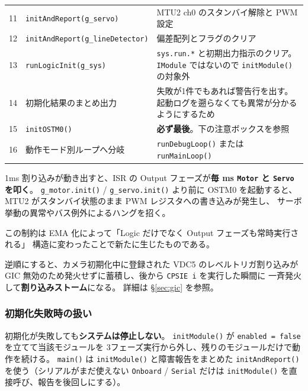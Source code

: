 \documentclass[a4paper,11pt,dvipdfmx]{jsarticle}
\begin{document}
\begin{longtable}{c l p{78mm}}
11 & \texttt{initAndReport(g\_servo)}    & MTU2 ch0 のスタンバイ解除と PWM 設定 \\
12 & \texttt{initAndReport(g\_lineDetector)} & 偏差配列とフラグのクリア \\
13 & \texttt{runLogicInit(g\_sys)}   & \texttt{sys.run.*} と初期出力指示のクリア。
     \texttt{IModule} ではないので \texttt{initModule()} の対象外 \\
14 & 初期化結果のまとめ出力     & 失敗が1件でもあれば警告行を出す。
     起動ログを遡らなくても異常が分かるようにするため \\
15 & \texttt{initOSTM0()}       & \textbf{必ず最後}。下の注意ボックスを参照 \\
16 & 動作モード別ループへ分岐   & \texttt{runDebugLoop()} または \texttt{runMainLoop()} \\
\bottomrule
\end{longtable}

\begin{cautionbox}
1ms 割り込みが動き出すと、ISR の Output フェーズが\textbf{毎 ms
\texttt{Motor} と \texttt{Servo} を叩く}。
\texttt{g\_motor.init()} / \texttt{g\_servo.init()} より前に OSTM0 を起動すると、
MTU2 がスタンバイ状態のまま PWM レジスタへの書き込みが発生し、
サーボ挙動の異常やバス例外によるハングを招く。

この制約は EMA 化によって「Logic だけでなく Output フェーズも常時実行される」
構造に変わったことで新たに生じたものである。
\end{cautionbox}

\begin{cautionbox}
逆順にすると、カメラ初期化中に登録された VDC5 のレベルトリガ割り込みが
GIC 無効のため発火せずに蓄積し、後から \texttt{CPSIE i} を実行した瞬間に
一斉発火して\textbf{割り込みストーム}になる。
詳細は \hyperref[sec:gic]{§\ref*{sec:gic}} を参照。
\end{cautionbox}

\subsubsection{初期化失敗時の扱い}\label{sec:bootfail}

初期化が失敗しても\textbf{システムは停止しない}。
\texttt{initModule()} が \texttt{enabled = false} を立てて当該モジュールを
3フェーズ実行から外し、残りのモジュールだけで動作を続ける。
\texttt{main()} は \texttt{initModule()} と障害報告をまとめた
\texttt{initAndReport()} を使う（シリアルがまだ使えない
\texttt{Onboard} / \texttt{Serial} だけは \texttt{initModule()} を直接呼び、報告を後回しにする）。
\end{document}
